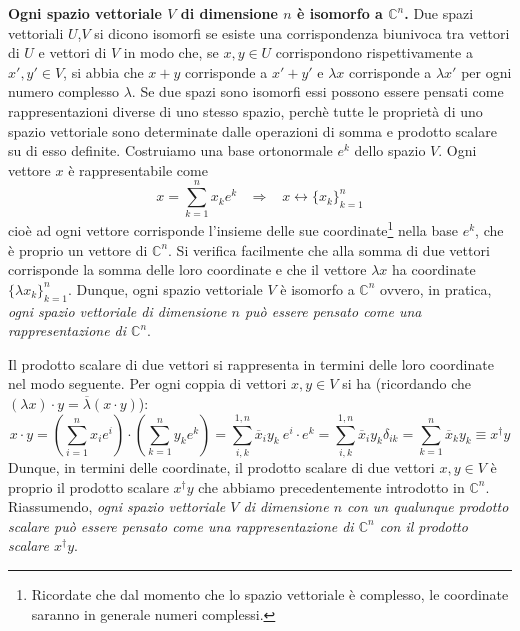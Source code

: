 \documentclass[a4paper,10pt]{article}
\newcommand{\linea}{\vskip14pt \noindent}
\begin{document}
\linea
{\bf Ogni spazio vettoriale $V$ di dimensione $n$ \`e isomorfo a $\mathbb{C}^n$.}
\vskip5pt
\noindent
Due spazi vettoriali $U$,$V$ si dicono isomorfi se esiste una corrispondenza biunivoca tra vettori di
$U$ e vettori di $V$ in modo che, se $x,y \in U$ corrispondono rispettivamente a $x',y' \in V$, 
si abbia che $x+y$ 
corrisponde a $x'+y'$ e $\lambda x$ corrisponde a $\lambda x'$ per ogni numero complesso $\lambda$.
Se due spazi sono isomorfi essi possono essere pensati come rappresentazioni diverse di uno stesso
spazio, perch\`e tutte le propriet\`a di uno spazio vettoriale sono determinate dalle operazioni di
somma e prodotto scalare su di esso definite.
\vskip5pt
\noindent
Costruiamo una base ortonormale $e^k$ dello spazio $V$. Ogni vettore $x$ \`e rappresentabile come
\begin{equation}
x=\sum_{k=1}^n x_k e^k \hspace{10pt} \Rightarrow \hspace{10pt} x \leftrightarrow \{x_k\}_{k=1}^n
\end{equation}
cio\`e ad ogni vettore corrisponde l'insieme delle sue 
coordinate\footnote{Ricordate che dal momento che lo spazio vettoriale \`e complesso, le coordinate saranno
in generale numeri complessi.}
nella base $e^k$, che \`e proprio un vettore di $\mathbb{C}^n$.
Si verifica facilmente che alla somma di due vettori corrisponde la somma delle loro coordinate e che il
vettore $\lambda x$ ha coordinate $\{\lambda x_k\}_{k=1}^n$. Dunque, ogni spazio vettoriale $V$ \`e
isomorfo a $\mathbb{C}^n$ ovvero, in pratica, {\it ogni spazio vettoriale di dimensione $n$ pu\`o
essere pensato come una rappresentazione di $\mathbb{C}^n$}.

\linea
Il prodotto scalare di due vettori si rappresenta in termini delle loro coordinate nel modo seguente.
Per ogni coppia di vettori $x,y \in V$ si ha (ricordando che 
$(\lambda x) \cdot y = \overline{\lambda} (x\cdot y)$):
\begin{equation}
x \cdot y = \left(\sum_{i=1}^n x_i e^i \right) \cdot \left( \sum_{k=1}^n y_k e^k \right) =
\sum_{i,k}^{1,n} \overline{x}_i y_k \ e^i \cdot e^k = \sum_{i,k}^{1,n} \overline{x}_i y_k \delta_{ik} =
\sum_{k=1}^n \overline{x}_k y_k \equiv x^\dag y
\end{equation}
Dunque, in termini delle coordinate, il prodotto scalare di due vettori $x,y \in V$ \`e proprio il prodotto
scalare $x^\dag y$ che abbiamo precedentemente introdotto in $\mathbb{C}^n$. Riassumendo, {\it ogni spazio
vettoriale $V$ di dimensione $n$ con un qualunque prodotto scalare pu\`o essere pensato come una
rappresentazione di $\mathbb{C}^n$ con il prodotto scalare  $x^\dag y$}.
\end{document}

